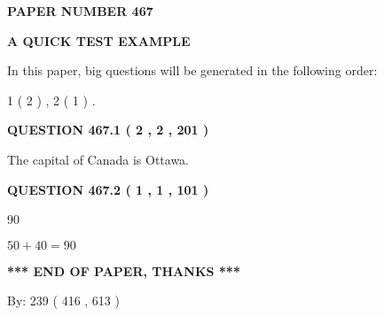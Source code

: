 \documentclass[12pt]{article}
\begin{document}
   
 {\textbf{ \Large{ PAPER NUMBER  467  }}}
   
   
\vspace{0.2in}
   
   
   
   
   
   
 \vspace{0.2in}
{\LARGE {\textbf{ A QUICK TEST EXAMPLE}}}
   
   
   
\vspace{0.2in}
   
In this paper, big questions will be generated in the following order: 
   
   
   1 ( 2 )
 ,
   2 ( 1 )
 .
  
\vspace{0.2in}
  
{\textbf{\Large{QUESTION
467.1 
 ( 2 , 2 , 201 )
}}}
  
  
 
 
\noindent{}
 
 
The capital of Canada is Ottawa.
 
 
 
 
  
\vspace{0.2in}
  
{\textbf{\Large{QUESTION
467.2 
 ( 1 , 1 , 101 )
}}}
  
  
 
 
\noindent{}

90
 
 
 
 
\noindent{}

$ %
50 +  %
40=   %
90$
 
 
   
   
 \vspace{0.2in}
 
   
   
   
   
\vspace{1.0in} 
{\textbf{\large{ *** END OF PAPER, THANKS *** }}} 
   
   
\hspace{1.0in} By: 
 239 ( 416 ,  613 )
   
\end{document}
